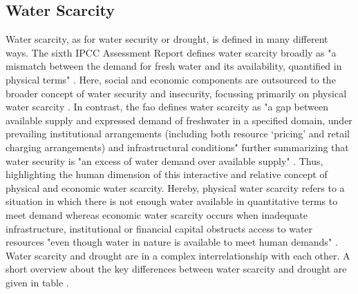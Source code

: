 
\subsection{Water Scarcity}\label{subsec:water_scarcity}

Water scarcity, as for water security or drought, is defined in many different ways. The sixth IPCC Assessment Report defines water scarcity broadly as "a mismatch between the demand for fresh water and its availability, quantified in physical terms" \autocite[560]{caretta2022water}. Here, social and economic components are outsourced to the broader concept of water security and insecurity, focussing primarily on physical water scarcity \autocite{caretta2022water}. In contrast, the \acrfull{fao} defines water scarcity as "a gap between available supply and expressed demand of freshwater in a specified domain, under prevailing institutional arrangements (including both resource ‘pricing’ and retail charging arrangements) and infrastructural conditions" \autocite[5]{faoCopingWaterScarcity2012} further summarizing that water security is "an excess of water demand over available supply" \autocite[6]{faoCopingWaterScarcity2012}. Thus, highlighting the human dimension of this interactive and relative concept of physical and economic water scarcity. Hereby, physical water scarcity refers to a situation in which there is not enough water available in quantitative terms to meet demand whereas economic water scarcity occurs when inadequate infrastructure, institutional or financial capital obstructs access to water resources "even though water in nature is available to meet human demands" \autocites{idmpDroughtWaterScarcity2022}[11]{moldenWaterFoodWater2007}.
Water scarcity and drought are in a complex interrelationship with each other. A short overview about the key differences between water scarcity and drought are given in table . 


